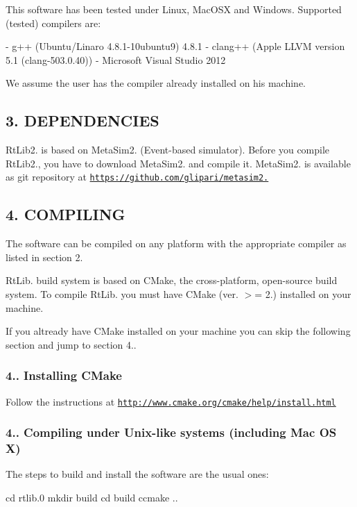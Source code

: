 This software has been tested under Linux, Mac\+O\+SX and Windows. Supported (tested) compilers are\+: \begin{DoxyVerb}- g++ (Ubuntu/Linaro 4.8.1-10ubuntu9) 4.8.1
- clang++ (Apple LLVM version 5.1 (clang-503.0.40))
- Microsoft Visual Studio 2012    
\end{DoxyVerb}


We assume the user has the compiler already installed on his machine.

\subsection*{3. D\+E\+P\+E\+N\+D\+E\+N\+C\+I\+ES}

Rt\+Lib2. is based on Meta\+Sim2. (Event-\/based simulator). Before you compile Rt\+Lib2., you have to download Meta\+Sim2. and compile it. Meta\+Sim2. is available as git repository at \href{https://github.com/glipari/metasim2.0}{\tt https\+://github.\+com/glipari/metasim2.}

\subsection*{4. C\+O\+M\+P\+I\+L\+I\+NG}

The software can be compiled on any platform with the appropriate compiler as listed in section 2.

Rt\+Lib. build system is based on C\+Make, the cross-\/platform, open-\/source build system. To compile Rt\+Lib. you must have C\+Make (ver. $>$= 2.) installed on your machine.

If you altready have C\+Make installed on your machine you can skip the following section and jump to section 4..

\subsubsection*{4.. Installing C\+Make}

Follow the instructions at \href{http://www.cmake.org/cmake/help/install.html}{\tt http\+://www.\+cmake.\+org/cmake/help/install.\+html}

\subsubsection*{4.. Compiling under Unix-\/like systems (including Mac OS X)}

The steps to build and install the software are the usual ones\+: \begin{DoxyVerb}cd rtlib.0
mkdir build
cd build
ccmake ..
\end{DoxyVerb}



